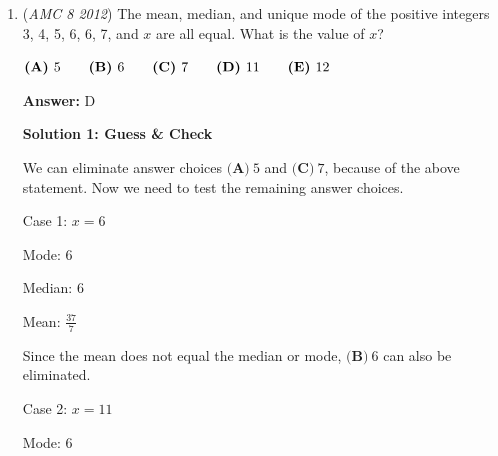 \begin{enumerate}
We can list out the four digits in the number. The first digit of the number can’t be 0 since the number is greater than $1000$. This leaves us with three integers for the digit in the thousands place. We have no restrictions in the hundreds place except for the fact that it can’t be the integer we chose for the thousands place. Continuing this pattern, there are $3$ choices for the thousands place, $3$ for the hundreds, $2$ for the tens, and $1$ for the ones. Adding this up we get $9$ which is choice $\boxed{\textbf{(D)} }$.

 —-jason.ca

 



\textbf{Solution 4 (Complementary Counting)}

There are $\frac{4!}{2!}$ ways to arrange the numbers in $2012$. The number of ways to arrange $2012$ with $0$ as the first digit is $3$ because there are three places to put the $1$ and the $2$s are the same. $12-3= 9$ which is choice $\boxed{\textbf{(D)} }$.

 


	\item (\textit{AMC 8 2012}) The mean, median, and unique mode of the positive integers 3, 4, 5, 6, 6, 7, and $x$ are all equal. What is the value of $x$?


 $\textbf{(A)}\hspace{.05in}5\qquad\textbf{(B)}\hspace{.05in}6\qquad\textbf{(C)}\hspace{.05in}7\qquad\textbf{(D)}\hspace{.05in}11\qquad\textbf{(E)}\hspace{.05in}12$

 \textbf{Answer: }D



\textbf{Solution 1: Guess & Check}

We can eliminate answer choices ${\textbf{(A)}\ 5}$ and ${\textbf{(C)}\ 7}$, because of the above statement. Now we need to test the remaining answer choices.

 Case 1: $x = 6$

 Mode: $6$

 Median: $6$

 Mean: $\frac{37}{7}$

 Since the mean does not equal the median or mode, ${\textbf{(B)}\ 6}$ can also be eliminated.

 Case 2: $x = 11$

 Mode: $6$


\end{enumerate}

